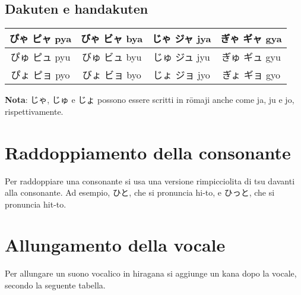 \documentclass{article}
\begin{document}
        \subsection{Dakuten e handakuten}

            \begin{center}
                \begin{japanese}
                    \begin{tabular}{|c|c|c|c|}
                        \hline
                        ぴゃ ピャ pya & びゃ ビャ bya & じゃ ジャ jya & ぎゃ ギャ gya\\
                        \hline
                        ぴゅ ピュ pyu & びゅ ビュ byu & じゅ ジュ jyu & ぎゅ ギュ gyu\\
                        \hline
                        ぴょ ピョ pyo & びょ ビョ byo & じょ ジョ jyo & ぎょ ギョ gyo\\
                        \hline
                    \end{tabular}
                \end{japanese}
            \end{center}

            \textbf{Nota}: \textjapanese{じゃ}, \textjapanese{じゅ} e \textjapanese{じょ} possono essere scritti in rōmaji
            anche come \textjapanese{ja}, \textjapanese{ju} e \textjapanese{jo}, rispettivamente.

    \section{Raddoppiamento della consonante}

        Per raddoppiare una consonante si usa una versione rimpicciolita di \textjapanese{tsu} davanti alla consonante.
        Ad esempio, \textjapanese{ひと}, che si pronuncia \textjapanese{hi-to}, e \textjapanese{ひっと}, che si pronuncia \textjapanese{hit-to}.

    \newpage

    \section{Allungamento della vocale}

        Per allungare un suono vocalico in hiragana si aggiunge un kana dopo la vocale, secondo la seguente tabella.
\end{document}
